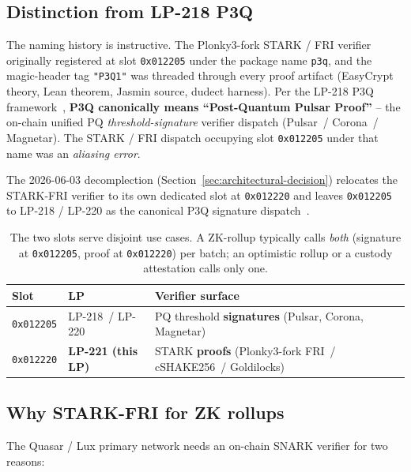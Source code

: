 \subsection{Distinction from LP-218 P3Q}

The naming history is instructive. The Plonky3-fork STARK / FRI
verifier originally registered at slot \texttt{0x012205} under the
package name \texttt{p3q}, and the magic-header tag \texttt{"P3Q1"}
was threaded through every proof artifact (EasyCrypt theory, Lean
theorem, Jasmin source, dudect harness). Per the LP-218 P3Q
framework~\cite{lp218}, \textbf{P3Q canonically means
``Post-Quantum Pulsar Proof''} -- the on-chain unified PQ
\emph{threshold-signature} verifier dispatch (Pulsar~/ Corona~/
Magnetar). The STARK / FRI dispatch occupying slot
\texttt{0x012205} under that name was an \emph{aliasing error}.

The 2026-06-03 decomplection (Section~\ref{sec:architectural-decision})
relocates the STARK-FRI verifier to its own dedicated slot at
\texttt{0x012220} and leaves \texttt{0x012205} to LP-218 / LP-220 as
the canonical P3Q signature dispatch~\cite{lp220}.

\begin{table}[h]
\centering
\small
\begin{tabular}{@{}lll@{}}
\toprule
\textbf{Slot} & \textbf{LP} & \textbf{Verifier surface} \\
\midrule
\texttt{0x012205} & LP-218~/ LP-220 & PQ threshold \textbf{signatures} (Pulsar, Corona, Magnetar) \\
\texttt{0x012220} & \textbf{LP-221 (this LP)} & STARK \textbf{proofs} (Plonky3-fork FRI~/ cSHAKE256~/ Goldilocks) \\
\bottomrule
\end{tabular}
\caption{The two slots serve disjoint use cases. A ZK-rollup
typically calls \emph{both} (signature at \texttt{0x012205}, proof
at \texttt{0x012220}) per batch; an optimistic rollup or a custody
attestation calls only one.}
\label{tab:p3q-vs-starkfri}
\end{table}

\subsection{Why STARK-FRI for ZK rollups}

The Quasar / Lux primary network needs an on-chain SNARK verifier
for two reasons:


